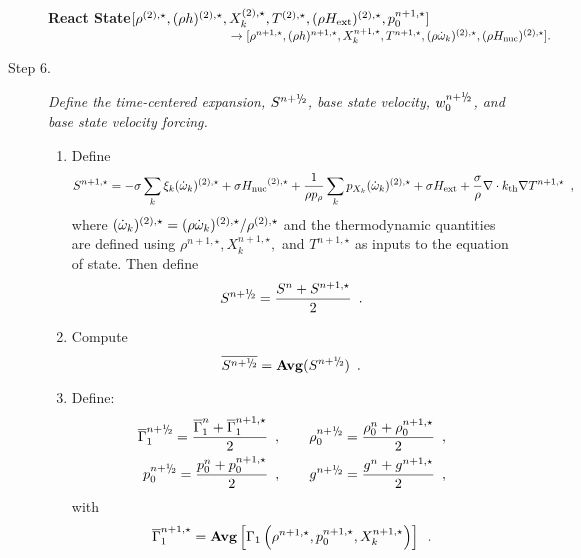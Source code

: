 \begin{description}
{\bf React State}$[ \rho^{(2),\star},(\rho h)^{(2),\star}, X_k^{(2),\star}, T^{(2),\star}, 
(\rho{H_{\rm ext}})^{(2),\star}, p_0^{n+1,\star}] $\\
$~~~~~~~~~~~~~~~~~~~~~~~~~~~~~~~~~~~~~~~~~~~~~
\rightarrow [ \rho^{n+1,\star},(\rho h)^{n+1,\star}, 
X_k^{n+1,\star}, T^{n+1,\star}, (\rho \dot{\omega}_k)^{(2),\star}, (\rho {H_{\rm nuc}})^{(2),\star} ].$

\item[Step 6.] {\em Define the time-centered expansion, $S^{n+\myhalf}$, base state
velocity, $w_0^{n+\myhalf}$, and base state velocity forcing.}

\begin{enumerate}
\renewcommand{\theenumi}{{\bf \alph{enumi}}}
\item Define
\begin{equation}
  S^{n+1,\star} =  -\sigma  \sum_k  \xi_k  (\dot{\omega}_k)^{(2),\star}  + 
  \sigma {H_{\rm nuc}}^{(2),\star} +
  \frac{1}{\rho p_\rho} \sum_k p_{X_k}  ({\dot{\omega}}_k)^{(2),\star}  
  + \sigma {H_{\rm ext}} + \frac{\sigma}{\rho}\nabla\cdot k_{\rm th}\nabla T^{n+1,\star} \enskip ,
\end{equation} 
where $(\dot{\omega}_k)^{(2),\star} = (\rho \dot{\omega}_k)^{(2),\star} / \rho^{(2),\star}$
and the thermodynamic quantities are defined using $\rho^{n+1,\star}, X_k^{n+1,\star},$ 
and $T^{n+1,\star}$ as inputs to the equation of state.
Then define
\begin{equation}
 S^\nph = \frac{S^n + S^{n+1,\star}}{2} \enskip. 
\end{equation}

\item Compute
\begin{equation}
\overline{S^{\nph}} = {\mathrm{\bf Avg}} (S^{\nph}) \enskip.
\end{equation}

\item Define:
\begin{eqnarray}
\gammabar^{\nph} = \frac{\gammabar^{n} + \gammabar^{n+1,\star}}{2}\enskip, \qquad
\rhozero^{\nph} = \frac{\rhozero^{n} + \rhozero^{n+1,\star}}{2}\enskip, \nonumber \\
p_0^{\nph} = \frac{p_0^{n} + p_0^{n+1,\star}}{2}\enskip, \qquad
g^\nph = \frac{g^n + g^{n+1,\star}}{2}\enskip ,
\end{eqnarray}
with
\begin{equation}
 \overline{\Gamma}_1^{n+1,\star} = {\rm{\bf Avg}} 
\left[ \Gamma_1\left(\rho^{n+1,\star}, p_0^{n+1,\star}, X_k^{n+1,\star}\right) \right] 
\enskip .
\end{equation}


\end{enumerate}
\end{description}
